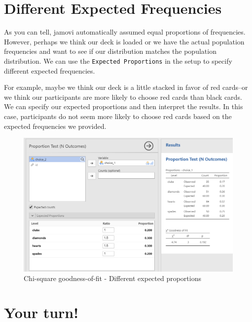\documentclass[
]{book}
\begin{document}
\hypertarget{different-expected-frequencies}{%
\section{Different Expected Frequencies}\label{different-expected-frequencies}}

As you can tell, jamovi automatically assumed equal proportions of frequencies. However, perhaps we think our deck is loaded or we have the actual population frequencies and want to see if our distribution matches the population distribution. We can use the \texttt{Expected\ Proportions} in the setup to specify different expected frequencies.

For example, maybe we think our deck is a little stacked in favor of red cards--or we think our participants are more likely to choose red cards than black cards. We can specify our expected proportions and then interpret the results. In this case, participants do not seem more likely to choose red cards based on the expected frequencies we provided.

\begin{figure}

{\centering \includegraphics[width=1\linewidth]{images/09-chi-square/chi-square_results2} 

}

\caption{Chi-square goodness-of-fit - Different expected proportions}\label{fig:unnamed-chunk-6}
\end{figure}

\hypertarget{your-turn-2}{%
\section{Your turn!}\label{your-turn-2}}
\end{document}
